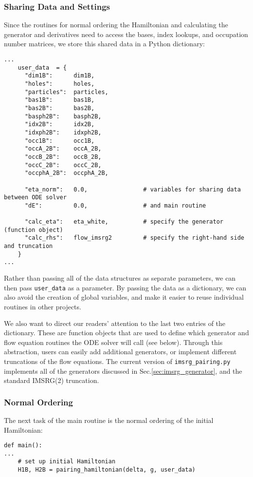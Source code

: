 {\subsubsection*{Sharing Data and Settings}
Since the routines for normal ordering the Hamiltonian and calculating 
the generator and derivatives need to access the bases, index lookups,
and occupation number matrices, we store this shared data in a Python
dictionary:

\begin{lstlisting}
...
    user_data  = {
      "dim1B":      dim1B, 
      "holes":      holes,
      "particles":  particles,
      "bas1B":      bas1B,
      "bas2B":      bas2B,
      "basph2B":    basph2B,
      "idx2B":      idx2B,
      "idxph2B":    idxph2B,
      "occ1B":      occ1B,
      "occA_2B":    occA_2B,
      "occB_2B":    occB_2B,
      "occC_2B":    occC_2B,
      "occphA_2B":  occphA_2B,

      "eta_norm":   0.0,                # variables for sharing data between ODE solver
      "dE":         0.0,                # and main routine
      
      "calc_eta":   eta_white,          # specify the generator (function object)
      "calc_rhs":   flow_imsrg2         # specify the right-hand side and truncation
    }
...
\end{lstlisting}

Rather than passing all of the data structures as separate parameters, we
can then pass \texttt{user\_data} as a parameter. By passing the data as a
dictionary, we can also avoid the creation of global variables, and make
it easier to reuse individual routines in other projects.

We also want to direct our readers' attention to the last two entries of
the dictionary. These are function objects that are used to define which
generator and flow equation routines the ODE solver will call (see below).
Through this abstraction, users can easily add additional generators, or
implement different truncations of the flow equations. The current version
of \texttt{imsrg\_pairing.py} implements all of the generators discussed
in Sec.\ref{sec:imsrg_generator}, and the standard IMSRG(2) truncation.

\subsubsection*{Normal Ordering}
The next task of the main routine is the normal ordering of the initial
Hamiltonian: 
\begin{lstlisting}
def main():
...
    # set up initial Hamiltonian
    H1B, H2B = pairing_hamiltonian(delta, g, user_data)


\end{lstlisting}}
